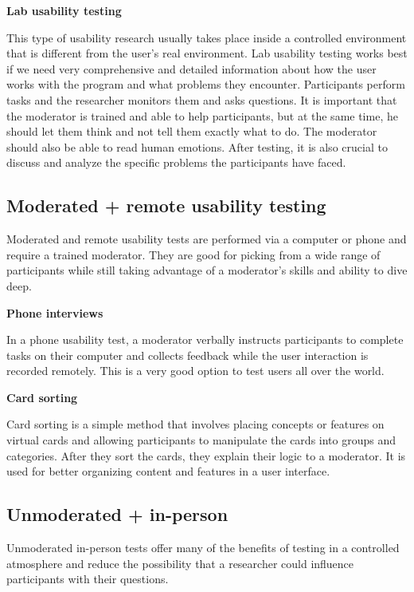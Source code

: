 \documentclass[a4paper,10pt,twoside]{article}
\begin{document}
\smallskip

\noindent \textbf {Lab usability testing}

\noindent This type of usability research usually takes place inside a controlled environment that is different from the user’s real environment.
Lab usability testing works best if we need very comprehensive and detailed information about how the user works with the program and what problems they encounter. Participants perform tasks and the researcher monitors them and asks questions. It is important that the moderator is trained and able to help participants, but at the same time, he should let them think and not tell them exactly what to do. The moderator should also be able to read human emotions. After testing, it is also crucial to discuss and analyze the specific problems the participants have faced.

\subsection{Moderated + remote usability testing}
Moderated and remote usability tests are performed via a computer or phone and require a trained moderator. They are good for picking from a wide range of participants while still taking advantage of a moderator's skills and ability to dive deep.

\smallskip

\noindent \textbf {Phone interviews}

\noindent In a phone usability test, a moderator verbally instructs participants to complete tasks on their computer and collects feedback while the user interaction is recorded remotely. This is a very good option to test users all over the world.

\smallskip

\noindent \textbf {Card sorting}

\noindent Card sorting is a simple method that involves placing concepts or features on virtual cards and allowing participants to manipulate the cards into groups and categories. After they sort the cards, they explain their logic to a moderator. It is used for better organizing content and features in a user interface.

\subsection {Unmoderated + in-person}
Unmoderated in-person tests offer many of the benefits of testing in a controlled atmosphere and reduce the possibility that a researcher could influence participants with their questions.
\end{document}
